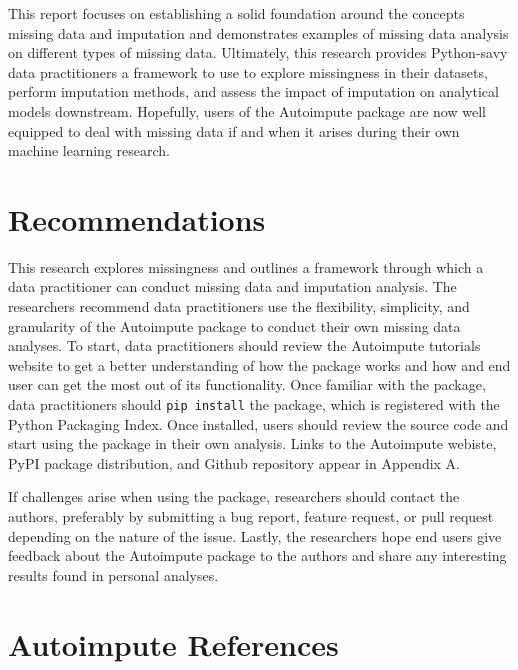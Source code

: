 \documentclass[12pt,oneside]{chicagocapstone}
\begin{document}
This report focuses on establishing a solid foundation around the
concepts missing data and imputation and demonstrates examples of
missing data analysis on different types of missing data. Ultimately,
this research provides Python-savy data practitioners a framework to use
to explore missingness in their datasets, perform imputation methods,
and assess the impact of imputation on analytical models downstream.
Hopefully, users of the Autoimpute package are now well equipped to deal
with missing data if and when it arises during their own machine
learning research.

\chapter*{Recommendations}\label{recommendations}

This research explores missingness and outlines a framework through
which a data practitioner can conduct missing data and imputation
analysis. The researchers recommend data practitioners use the
flexibility, simplicity, and granularity of the Autoimpute package to
conduct their own missing data analyses. To start, data practitioners
should review the Autoimpute tutorials website to get a better
understanding of how the package works and how and end user can get the
most out of its functionality. Once familiar with the package, data
practitioners should \texttt{pip\ install} the package, which is
registered with the Python Packaging Index. Once installed, users should
review the source code and start using the package in their own
analysis. Links to the Autoimpute webiste, PyPI package distribution,
and Github repository appear in Appendix A.

If challenges arise when using the package, researchers should contact
the authors, preferably by submitting a bug report, feature request, or
pull request depending on the nature of the issue. Lastly, the
researchers hope end users give feedback about the Autoimpute package to
the authors and share any interesting results found in personal
analyses.

\appendix

\chapter{Autoimpute References}\label{autoimpute-references}
\end{document}
